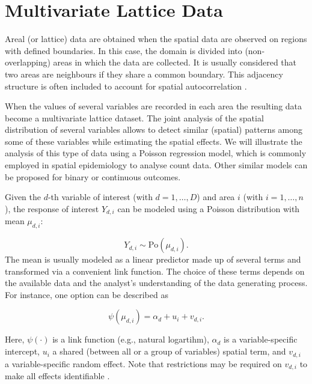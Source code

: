 \section{Multivariate Lattice Data}
\label{sec:lattice}

\medskip
Areal (or lattice) data are obtained when the spatial data are observed on regions with defined boundaries. In this case, the domain is divided into (non-overlapping) areas in which the data are collected. It is usually considered that two areas are neighbours if they share a common boundary. This adjacency structure is often included to account for spatial autocorrelation \citep{banerjee2014hierarchical}. 

\medskip
When the values of several variables are recorded in each area the resulting data become a multivariate lattice dataset. The joint analysis of the spatial distribution of several variables allows to detect similar (spatial) patterns among some of these variables \citep[][ Chapter 10]{banerjee2014hierarchical} while estimating the spatial effects. We will illustrate the analysis of this type of data using a Poisson regression model, which is commonly employed in spatial epidemiology to analyse count data. Other similar models can be proposed for binary or continuous outcomes.

\medskip
Given the $d$-th variable  of interest (with $d=1,\ldots,D$) and area $i$ (with $i=1,\ldots,n$), the response of interest $Y_{d, i} $ can be modeled using a Poisson distribution with mean $\mu_{d,i}$:

$$
Y_{d, i} \sim \textrm{Po}(\mu_{d,i}) .
$$
\noindent
The mean is usually modeled as a linear predictor made up of several terms and transformed via a convenient link function. The choice of these terms depends on the available data and the analyst's understanding of the data generating process. For instance, one option can be described as

$$
\psi(\mu_{d, i}) = \alpha_d + u_i + v_{d,i} .
$$

\noindent
Here, $\psi(\cdot)$ is a link function (e.g., natural logartihm), $\alpha_d$ is a variable-specific intercept, $u_i$ a shared (between all or a group of variables) spatial term, and $v_{d,i}$ a variable-specific random effect. Note that restrictions may be required on $v_{d,i}$ to make all effects identifiable \citep{rueheld:2005}.

